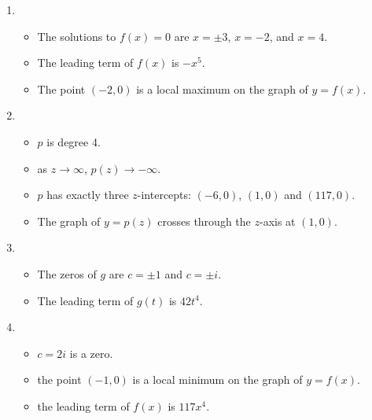 \begin{enumerate}
\begin{itemize}
\end{itemize}

\enlargethispage{0.25in}

\item

\begin{itemize}

\item The solutions to $f(x) =0$ are $x = \pm 3$, $x=-2$, and $x=4$.
\item The leading term of $f(x)$ is $-x^5$.
\item The point $(-2, 0)$ is a local maximum on the graph of $y=f(x)$.

\end{itemize}

\item 

\begin{itemize}

\item $p$ is degree 4.
\item as $z \rightarrow \infty$, $p(z) \rightarrow -\infty$.
\item $p$ has exactly three $z$-intercepts:  $(-6,0)$, $(1,0)$ and $(117,0)$.
\item  The graph of $y=p(z)$ crosses through the $z$-axis at $(1,0)$.

\end{itemize}



\item

\begin{itemize}

\item The zeros of $g$ are $c=\pm 1$ and $c = \pm i$.
\item The leading term of $g(t)$ is $42t^4$.

\end{itemize}


\item

\begin{itemize}

\item $c=2i$ is a zero.
\item the point $(-1,0)$ is a local minimum on the graph of $y=f(x)$.
\item the leading term of $f(x)$ is $117x^4$.

\end{itemize}



\end{enumerate}
